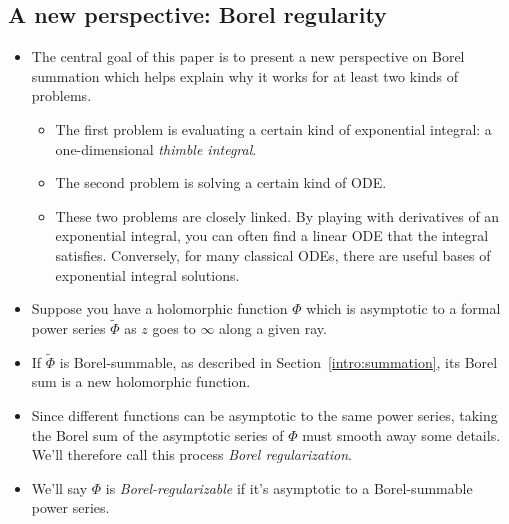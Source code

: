 \documentclass{article}
\newcommand{\series}[1]{\tilde{#1}}
\begin{document}
\subsection{A new perspective: Borel regularity}
\begin{itemize}
\item The central goal of this paper is to present a new perspective on Borel summation which helps explain why it works for at least two kinds of problems.
\begin{itemize}
\item The first problem is evaluating a certain kind of exponential integral: a one-dimensional {\em thimble integral}.
\item The second problem is solving a certain kind of ODE.
\item These two problems are closely linked. By playing with derivatives of an exponential integral, you can often find a linear ODE that the integral satisfies. Conversely, for many classical ODEs, there are useful bases of exponential integral solutions.
\end{itemize}
\item Suppose you have a holomorphic function $\Phi$ which is asymptotic to a formal power series $\series{\Phi}$ as $z$ goes to $\infty$ along a given ray.
\item If $\series{\Phi}$ is Borel-summable, as described in Section~\ref{intro:summation}, its Borel sum is a new holomorphic function.
\item Since different functions can be asymptotic to the same power series, taking the Borel sum of the asymptotic series of $\Phi$ must smooth away some details. We'll therefore call this process {\em Borel regularization}.
\item We'll say $\Phi$ is {\em Borel-regularizable} if it's asymptotic to a Borel-summable power series.

\end{itemize}
\end{document}
